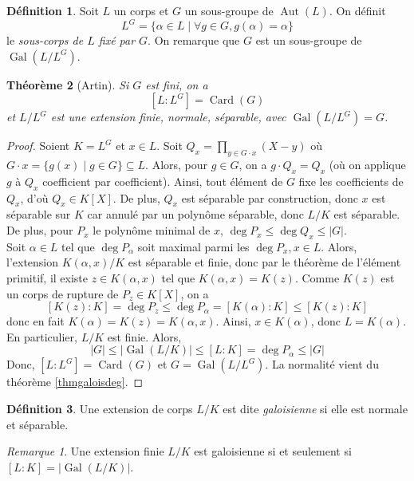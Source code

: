 \documentclass{article}
\DeclareMathOperator{\Card}{Card}
\DeclareMathOperator{\Gal}{Gal}
\DeclareMathOperator{\Aut}{Aut}
\theoremstyle{plain}
\newtheorem{theorem}{Théorème}[subsection]
\theoremstyle{definition}
\newtheorem{definition}[theorem]{Définition}
\theoremstyle{remark}
\newtheorem*{remark}{Remarque}
\begin{document}
\begin{definition}
    Soit $L$ un corps et $G$ un sous-groupe de $\Aut(L)$. On définit
    \[L^G = \{\alpha \in L \mid \forall g \in G, g(\alpha) = \alpha\}\]
    le \emph{sous-corps de $L$ fixé par $G$}. On remarque que $G$ est un sous-groupe de $\Gal(L/L^G)$.
\end{definition}

\begin{theorem}[Artin]
    Si $G$ est fini, on a
    \[[L : L^G] = \Card(G)\]
    et $L/L^G$ est une extension finie, normale, séparable, avec $\Gal(L/L^G) = G$.
\end{theorem}

\begin{proof}
    Soient $K = L^G$ et $x \in L$. Soit $Q_x = \prod\limits_{y \in G\cdot x} (X - y)$ où $G \cdot x = \{g(x) \mid g\in G\} \subseteq L$. Alors, pour $g \in G$, on a $g \cdot Q_x = Q_x$ (où on applique $g$ à $Q_x$ coefficient par coefficient). Ainsi, tout élément de $G$ fixe les coefficients de $Q_x$, d'où $Q_x \in K [X]$. De plus, $Q_x$ est séparable par construction, donc $x$ est séparable sur $K$ car annulé par un polynôme séparable, donc $L/K$ est séparable. De plus, pour $P_x$ le polynôme minimal de $x$, $\deg P_x \le \deg Q_x \le |G|$. \\
    Soit $\alpha \in L$ tel que $\deg P_\alpha$ soit maximal parmi les $\deg P_x, x\in L$. Alors, l'extension $K(\alpha,x)/K$ est séparable et finie, donc par le théorème de l'élément primitif, il existe $z \in K(\alpha,x)$ tel que $K(\alpha,x) = K(z)$. Comme $K(z)$ est un corps de rupture de $P_z \in K [X]$, on a
    \[[K(z) : K] = \deg P_z \le \deg P_\alpha = [K(\alpha) : K] \le [K(z) : K]\]
    donc en fait $K(\alpha) = K(z) = K(\alpha,x)$. Ainsi, $x \in K(\alpha)$, donc $L = K(\alpha)$. En particulier, $L/K$ est finie. Alors,
    \[|G| \le |\Gal(L/K)| \le [L : K] = \deg P_\alpha \le |G|\]
    Donc, $[L : L^G] = \Card(G)$ et $G = \Gal(L/L^G)$. La normalité vient du théorème \ref{thmgaloisdeg}.
\end{proof}

\begin{definition}
    Une extension de corps $L/K$ est dite \emph{galoisienne} si elle est normale et séparable.
\end{definition}

\begin{remark}
    Une extension finie $L/K$ est galoisienne si et seulement si $[L : K] = |\Gal(L/K)|$.
\end{remark}
\end{document}
